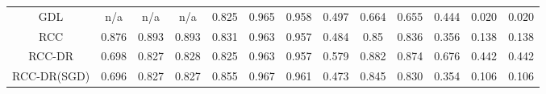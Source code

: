 \begin{tabular}{|c|ccc|ccc|ccc|ccc|}
GDL	&	n/a	&	n/a	&	n/a	&	0.825	&	0.965	&	0.958	&	0.497	&	0.664	&	0.655	&	0.444	&	0.020	&	0.020	\\																					
RCC	&	0.876	&	0.893	&	0.893	&	0.831	&	0.963	&	0.957	&	0.484	&	0.85	&	0.836	&	0.356	&	0.138	&	0.138	\\																					
RCC-DR	&	0.698	&	0.827	&	0.828	&	0.825	&	0.963	&	0.957	&	0.579	&	0.882	&	0.874	&	0.676	&	0.442	&	0.442	\\																					
RCC-DR(SGD)	&	0.696	&	0.827	&	0.827	&	0.855	&	0.967	&	0.961	&	0.473	&	0.845	&	0.830	&	0.354	&	0.106	&	0.106	\\																					



\end{tabular}
